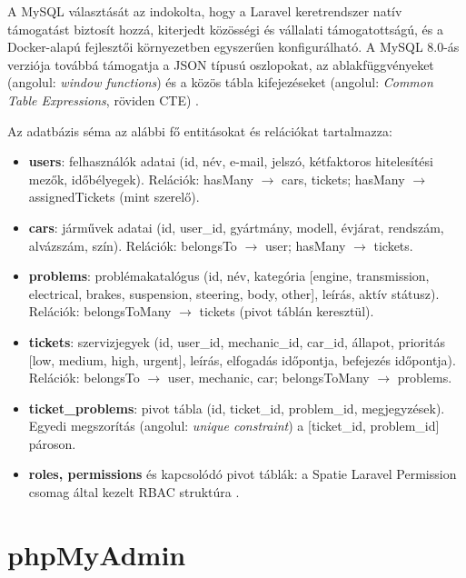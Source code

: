 \documentclass[colorlinks]{thesis-kando}
\begin{document}
A MySQL választását az indokolta, hogy a Laravel keretrendszer natív támogatást biztosít hozzá, kiterjedt közösségi és vállalati támogatottságú, és a Docker-alapú fejlesztői környezetben egyszerűen konfigurálható. A MySQL 8.0-ás verziója továbbá támogatja a JSON típusú oszlopokat, az ablakfüggvényeket (angolul: \emph{window functions}) és a közös tábla kifejezéseket (angolul: \emph{Common Table Expressions}, röviden CTE) \cite{ref16}.


Az adatbázis séma az alábbi fő entitásokat és relációkat tartalmazza:

\begin{itemize}
\item \textbf{users}: felhasználók adatai (id, név, e-mail, jelszó, kétfaktoros hitelesítési mezők, időbélyegek). Relációk: hasMany $\rightarrow$ cars, tickets; hasMany $\rightarrow$ assignedTickets (mint szerelő).
\item \textbf{cars}: járművek adatai (id, user\_id, gyártmány, modell, évjárat, rendszám, alvázszám, szín). Relációk: belongsTo $\rightarrow$ user; hasMany $\rightarrow$ tickets.
\item \textbf{problems}: problémakatalógus (id, név, kategória [engine, transmission, electrical, brakes, suspension, steering, body, other], leírás, aktív státusz). Relációk: belongsToMany $\rightarrow$ tickets (pivot táblán keresztül).
\item \textbf{tickets}: szervizjegyek (id, user\_id, mechanic\_id, car\_id, állapot, prioritás [low, medium, high, urgent], leírás, elfogadás időpontja, befejezés időpontja). Relációk: belongsTo $\rightarrow$ user, mechanic, car; belongsToMany $\rightarrow$ problems.
\item \textbf{ticket\_problems}: pivot tábla (id, ticket\_id, problem\_id, megjegyzések). Egyedi megszorítás (angolul: \emph{unique constraint}) a [ticket\_id, problem\_id] pároson.
\item \textbf{roles, permissions} és kapcsolódó pivot táblák: a Spatie Laravel Permission csomag által kezelt RBAC struktúra \cite{ref15}.
\end{itemize}

\section{phpMyAdmin}
\end{document}
